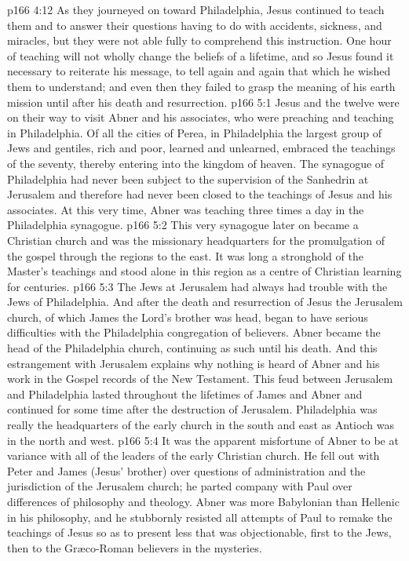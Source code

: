 \vs p166 4:12 \pc As they journeyed on toward Philadelphia, Jesus continued to teach them and to answer their questions having to do with accidents, sickness, and miracles, but they were not able fully to comprehend this instruction. One hour of teaching will not wholly change the beliefs of a lifetime, and so Jesus found it necessary to reiterate his message, to tell again and again that which he wished them to understand; and even then they failed to grasp the meaning of his earth mission until after his death and resurrection.
\vs p166 5:1 Jesus and the twelve were on their way to visit Abner and his associates, who were preaching and teaching in Philadelphia. Of all the cities of Perea, in Philadelphia the largest group of Jews and gentiles, rich and poor, learned and unlearned, embraced the teachings of the seventy, thereby entering into the kingdom of heaven. The synagogue of Philadelphia had never been subject to the supervision of the Sanhedrin at Jerusalem and therefore had never been closed to the teachings of Jesus and his associates. At this very time, Abner was teaching three times a day in the Philadelphia synagogue.
\vs p166 5:2 This very synagogue later on became a Christian church and was the missionary headquarters for the promulgation of the gospel through the regions to the east. It was long a stronghold of the Master’s teachings and stood alone in this region as a centre of Christian learning for centuries.
\vs p166 5:3 The Jews at Jerusalem had always had trouble with the Jews of Philadelphia. And after the death and resurrection of Jesus the Jerusalem church, of which James the Lord’s brother was head, began to have serious difficulties with the Philadelphia congregation of believers. Abner became the head of the Philadelphia church, continuing as such until his death. And this estrangement with Jerusalem explains why nothing is heard of Abner and his work in the Gospel records of the New Testament. This feud between Jerusalem and Philadelphia lasted throughout the lifetimes of James and Abner and continued for some time after the destruction of Jerusalem. Philadelphia was really the headquarters of the early church in the south and east as Antioch was in the north and west.
\vs p166 5:4 \pc It was the apparent misfortune of Abner to be at variance with all of the leaders of the early Christian church. He fell out with Peter and James (Jesus’ brother) over questions of administration and the jurisdiction of the Jerusalem church; he parted company with Paul over differences of philosophy and theology. Abner was more Babylonian than Hellenic in his philosophy, and he stubbornly resisted all attempts of Paul to remake the teachings of Jesus so as to present less that was objectionable, first to the Jews, then to the Gr\ae co\hyp{}Roman believers in the mysteries.
